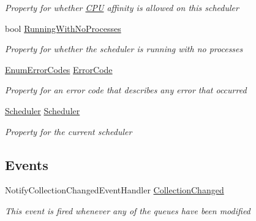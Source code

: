 \begin{DoxyCompactItemize}
\begin{DoxyCompactList}\small\item\em Property for whether \hyperlink{namespace_c_p_u___o_s___simulator_1_1_c_p_u}{C\+P\+U} affinity is allowed on this scheduler \end{DoxyCompactList}\item 
bool \hyperlink{class_c_p_u___o_s___simulator_1_1_operating___system_1_1_o_s_core_a1f01594c8f33961b5dc5ffffaf7644ce}{Running\+With\+No\+Processes}
\begin{DoxyCompactList}\small\item\em Property for whether the scheduler is running with no processes \end{DoxyCompactList}\item 
\hyperlink{namespace_c_p_u___o_s___simulator_1_1_operating___system_aea0b669d1bbf5690ae34ac2f8bef9470}{Enum\+Error\+Codes} \hyperlink{class_c_p_u___o_s___simulator_1_1_operating___system_1_1_o_s_core_a77a647e293c14574919b144cb2e8998f}{Error\+Code}
\begin{DoxyCompactList}\small\item\em Property for an error code that describes any error that occurred \end{DoxyCompactList}\item 
\hyperlink{class_c_p_u___o_s___simulator_1_1_operating___system_1_1_scheduler}{Scheduler} \hyperlink{class_c_p_u___o_s___simulator_1_1_operating___system_1_1_o_s_core_aa97bbf90ba03bd17c02f889189108455}{Scheduler}
\begin{DoxyCompactList}\small\item\em Property for the current scheduler \end{DoxyCompactList}\end{DoxyCompactItemize}
\subsection*{Events}
\begin{DoxyCompactItemize}
\item 
Notify\+Collection\+Changed\+Event\+Handler \hyperlink{class_c_p_u___o_s___simulator_1_1_operating___system_1_1_o_s_core_abcbb2efff8a4078fae3edb9b31f62198}{Collection\+Changed}
\begin{DoxyCompactList}\small\item\em This event is fired whenever any of the queues have been modified \end{DoxyCompactList}\end{DoxyCompactItemize}
